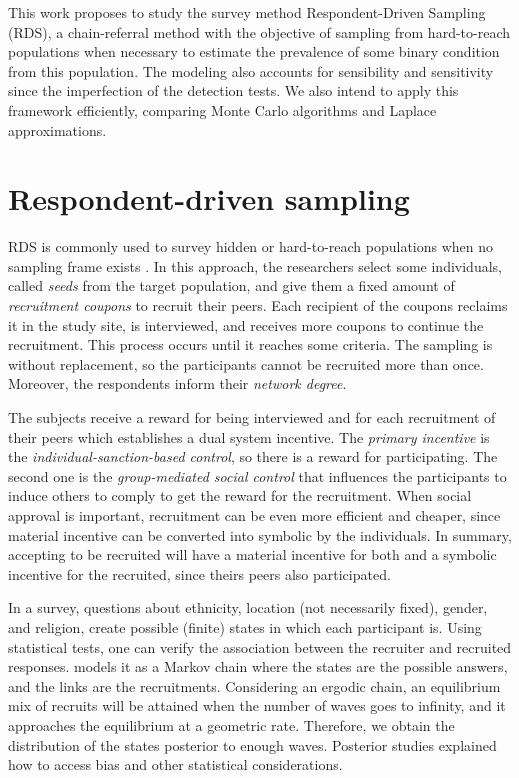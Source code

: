 This work proposes to study the survey method Respondent-Driven Sampling (RDS), a chain-referral method with the objective of sampling from hard-to-reach populations when necessary to estimate the prevalence of some binary condition from this population. The modeling also accounts for sensibility and sensitivity since the imperfection of the detection tests. We also intend to apply
this framework efficiently, comparing Monte Carlo algorithms and Laplace approximations.

\section{Respondent-driven sampling}

RDS is commonly used to survey hidden or hard-to-reach populations when
no sampling frame exists \cite{heckathorn1997}. In this approach, the
researchers select some individuals, called {\em seeds} from the target
population, and give them a fixed amount of {\em recruitment coupons} to
recruit their peers. Each recipient of the coupons reclaims it in the study
site, is interviewed, and receives more coupons to continue the recruitment.
This process occurs until it reaches some criteria. The sampling is without
replacement, so the participants cannot be recruited more than once. Moreover,
the respondents inform their {\em network degree}.

The subjects receive a reward for being interviewed and for each recruitment
of their peers which establishes a dual system incentive. The {\em primary incentive} is the
{\em individual-sanction-based control}, so there is a reward for
participating. The second one is the {\em group-mediated social control} that
influences the participants to induce others to comply to get the reward for the recruitment. When social approval is important, recruitment can be even
more efficient and cheaper, since material incentive can be converted into
symbolic by the individuals. In summary, accepting to be recruited will have a
material incentive for both and a symbolic incentive for the recruited, since
theirs peers also participated.

In a survey, questions about ethnicity, location (not necessarily fixed),
gender, and religion, create possible (finite) states in which each
participant is. Using statistical tests, one can verify the association between
the recruiter and recruited responses. \citeauthor{heckathorn1997} models it
as a Markov chain where the states are the possible answers, and the links are
the recruitments. Considering an ergodic chain, an equilibrium mix of recruits
will be attained when the number of waves goes to infinity, and it approaches
the equilibrium at a geometric rate. Therefore, we obtain the distribution of
the states posterior to enough waves. Posterior studies \cite{heckathorn2002}
explained how to access bias and other statistical considerations. 

